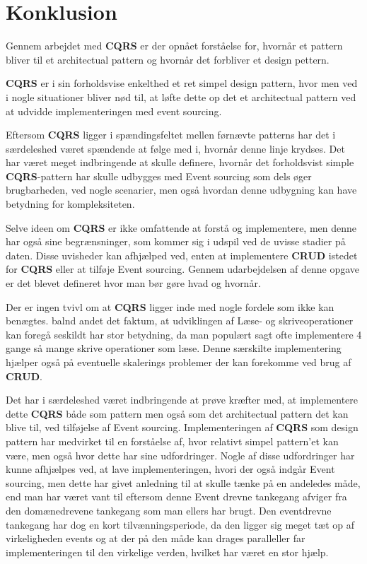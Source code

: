 \chapter{Konklusion}
Gennem arbejdet med \textbf{CQRS} er der opnået forståelse for, hvornår et pattern bliver til et architectual pattern og hvornår det forbliver et design pettern.

\textbf{CQRS} er i sin forholdsvise enkelthed et ret simpel design pattern, hvor men ved i nogle situationer bliver nød til, at løfte dette op det et architectual pattern ved at udvidde implementeringen med event sourcing.

Eftersom \textbf{CQRS} ligger i spændingsfeltet mellen førnævte patterns har det i særdeleshed været spændende at følge med i, hvornår denne linje krydses. Det har været meget indbringende at skulle definere, hvornår det forholdsvist simple \textbf{CQRS}-pattern har skulle udbygges med Event sourcing som dels øger brugbarheden, ved nogle scenarier, men også hvordan denne udbygning kan have betydning for kompleksiteten.

Selve ideen om \textbf{CQRS} er ikke omfattende at forstå og implementere, men denne har også sine begrænsninger, som kommer sig i udspil ved de uvisse stadier på daten. Disse uvisheder kan afhjælped ved, enten at implementere \textbf{CRUD} istedet for \textbf{CQRS} eller at tilføje Event sourcing. Gennem udarbejdelsen af denne opgave er det blevet defineret hvor man bør gøre hvad og hvornår. 

Der er ingen tvivl om at \textbf{CQRS} ligger inde med nogle fordele som ikke kan benægtes. balnd andet det faktum, at udviklingen af Læse- og skriveoperationer kan foregå seskildt har stor betydning, da man populært sagt ofte implementere 4 gange så mange skrive operationer som læse. Denne særskilte implementering hjælper også på eventuelle skalerings problemer der kan forekomme ved brug af \textbf{CRUD}.\newline 

Det har i særdeleshed været indbringende at prøve kræfter med, at implementere dette \textbf{CQRS} både som pattern men også som det architectual pattern det kan blive til, ved tilføjelse af Event sourcing. Implementeringen af \textbf{CQRS} som design pattern har medvirket til en forståelse af, hvor relativt simpel pattern'et kan være, men også hvor dette har sine udfordringer. Nogle af disse udfordringer har kunne afhjælpes ved, at lave implementeringen, hvori der også indgår Event sourcing, men dette har givet anledning til at skulle tænke på en andeledes måde, end man har været vant til eftersom denne Event drevne tankegang afviger fra den domænedrevene tankegang som man ellers har brugt. 
Den eventdrevne tankegang har dog en kort tilvænningsperiode, da den ligger sig meget tæt op af virkeligheden events og at der på den måde kan drages paralleller far implementeringen til den virkelige verden, hvilket har været en stor hjælp. 

